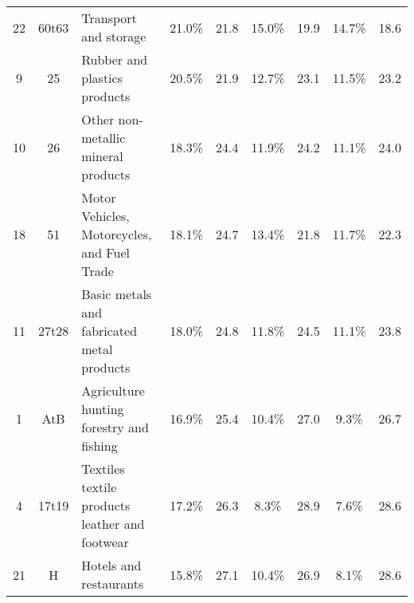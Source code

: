 \documentclass[10pt]{article}
\begin{document}
\begin{table}[!h]
{\begin{tabular}{cc|lcccccc}
22                                & 60t63                     & \multicolumn{1}{l|}{Transport and storage}                                                  & 21.0\% & \multicolumn{1}{c|}{21.8}                        & 15.0\% & \multicolumn{1}{c|}{19.9}                        & 14.7\%              & 18.6              \\
9                                 & 25                        & \multicolumn{1}{l|}{Rubber and plastics products}                                           & 20.5\% & \multicolumn{1}{c|}{21.9}                        & 12.7\% & \multicolumn{1}{c|}{23.1}                        & 11.5\%              & 23.2              \\
10                                & 26                        & \multicolumn{1}{l|}{Other non-metallic mineral products}                                    & 18.3\% & \multicolumn{1}{c|}{24.4}                        & 11.9\% & \multicolumn{1}{c|}{24.2}                        & 11.1\%              & 24.0              \\
18                                & 51                        & \multicolumn{1}{l|}{Motor Vehicles, Motorcycles, and Fuel Trade}                            & 18.1\% & \multicolumn{1}{c|}{24.7}                        & 13.4\% & \multicolumn{1}{c|}{21.8}                        & 11.7\%              & 22.3              \\
11                                & 27t28                     & \multicolumn{1}{l|}{Basic metals and fabricated metal products}                             & 18.0\% & \multicolumn{1}{c|}{24.8}                        & 11.8\% & \multicolumn{1}{c|}{24.5}                        & 11.1\%              & 23.8              \\
1                                 & AtB                       & \multicolumn{1}{l|}{Agriculture hunting forestry and fishing}                               & 16.9\% & \multicolumn{1}{c|}{25.4}                        & 10.4\% & \multicolumn{1}{c|}{27.0}                        & 9.3\%               & 26.7              \\
4                                 & 17t19                     & \multicolumn{1}{l|}{Textiles textile products leather and footwear}                         & 17.2\% & \multicolumn{1}{c|}{26.3}                        & 8.3\%  & \multicolumn{1}{c|}{28.9}                        & 7.6\%               & 28.6              \\
21                                & H                         & \multicolumn{1}{l|}{Hotels and restaurants}                                                 & 15.8\% & \multicolumn{1}{c|}{27.1}                        & 10.4\% & \multicolumn{1}{c|}{26.9}                        & 8.1\%               & 28.6              \\

\end{tabular}}
\end{table}
\end{document}
